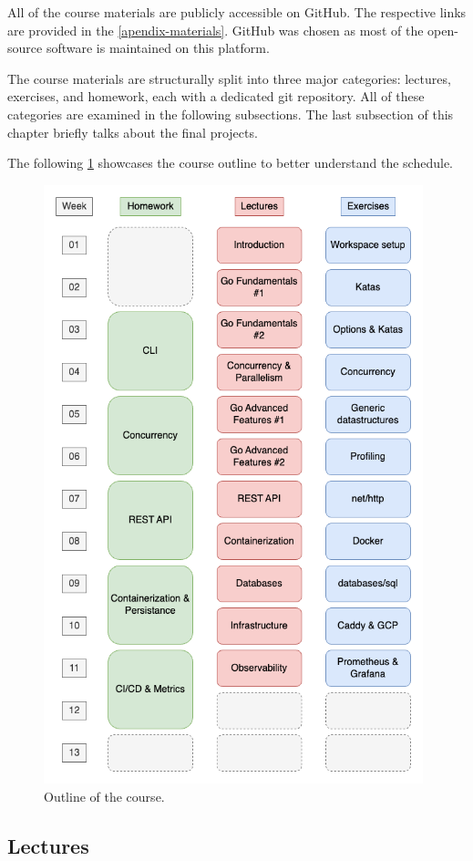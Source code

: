 \documentclass[
  digital,
  color,
  oneside,
  nosansbold,
  nocolorbold,
  lof,
  nolot,
]{fithesis4}
\begin{document}
All of the course materials are publicly accessible on GitHub\cite{github}. The respective links are provided in the \cref{apendix-materials}. GitHub was chosen as most of the open-source software is maintained on this platform.

The course materials are structurally split into three major categories: lectures, exercises, and homework, each with a dedicated git repository. All of these categories are examined in the following subsections. The last subsection of this chapter briefly talks about the final projects.

The following \cref{schedule-outline} showcases the course outline to better understand the schedule.

\begin{figure}[H]
    \centering
    \includegraphics[width=11cm]{figures/schedule.png}
    \caption{Outline of the course.}
    \label{schedule-outline}
\end{figure}

\subsection{Lectures}
\end{document}
